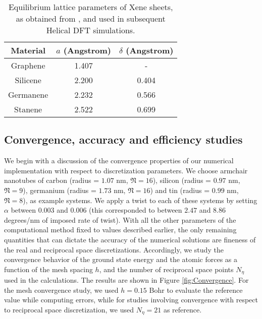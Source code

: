 \documentclass[preprint,12pt, 3p, sort&compress]{elsarticle}
\begin{document}
\begin{table}[ht]
\centering
\begin{tabular}{c  c  c}
\hline
Material & $a$ (Angstrom) & $\delta$ (Angstrom)  \\   
\hline
Graphene  & 1.407 &  - \\
Silicene  &  2.200 & 0.404  \\
Germanene & 2.232 & 0.566 \\
Stanene  & 2.522 & 0.699 \\
\hline
\end{tabular}
\caption{Equilibrium lattice parameters of Xene sheets, as obtained from \citep{ghosh2019symmetry}, and used in subsequent Helical DFT simulations.}
\label{Table:LatticeParameters}
\end{table} 
\subsection{Convergence, accuracy and efficiency studies}
\label{subsec:convergence_accuracy_efficiency}
We begin with a discussion of the convergence properties of our numerical implementation {with respect to discretization parameters}. We choose armchair nanotubes of carbon (radius = $1.07$ nm, $\mathfrak{N} = 16$), silicon (radius = $0.97$ nm, $\mathfrak{N} = 9$), germanium (radius = $1.73$ nm, $\mathfrak{N} = 16$) and tin (radius = $0.99$ nm, $\mathfrak{N} = 8$), as example systems. We apply a twist to each of these systems by setting $\alpha$ between $0.003$ and $0.006$ (this corresponded to between $2.47$ and $8.86$ degrees/nm of imposed rate of twist). With all the other parameters of the computational method fixed to values described earlier, the only remaining quantities that can dictate the accuracy of the numerical solutions are fineness of the real and reciprocal space discretizations. Accordingly, we study the convergence behavior of the ground state energy and the atomic forces as a function of the mesh spacing $h$, and the number of reciprocal space points $N_{\eta}$ used in the calculations. The results are shown in Figure \ref{fig:Convergence}. For the mesh convergence study, we used $h = 0.15$ Bohr to evaluate the reference value while computing errors, while for studies involving convergence with respect to reciprocal space discretization, we used $N_{\eta} = 21$ as reference.
\end{document}
